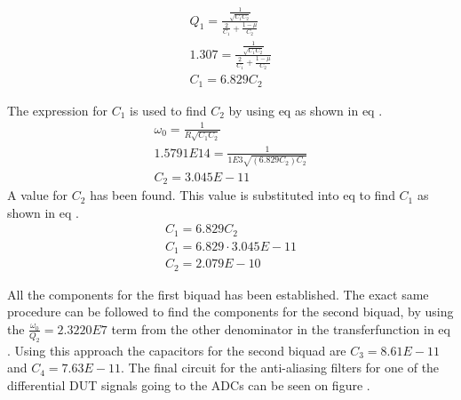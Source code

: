  \begin{equation}\label{eq:7_1_4_C1}
    \begin{aligned}
        Q_1 = \frac{ \frac{1}{\sqrt{C_1C_2}} }{ \frac{2}{C_1} + \frac{1-\mu}{C_2}}\\
        1.307 = \frac{ \frac{1}{\sqrt{C_1C_2}} }{ \frac{2}{C_1} + \frac{1-\mu}{C_2}}\\
        C_1 = 6.829C_2
    \end{aligned}
 \end{equation}

 The expression for $C_1$ is used to find $C_2$ by using eq  as shown in eq .
 \begin{equation}\label{eq:7_1_4_C2}
    \begin{aligned}
        \omega_0 = \frac{1}{R\sqrt{C_1C_2}}\\
        1.5791E14 = \frac{1}{1E3\sqrt{(6.829C_2)C_2}}\\
        C_2 = 3.045E-11
    \end{aligned}
 \end{equation}
 A value for $C_2$ has been found. This value is substituted into eq  to find $C_1$ as shown in eq .
 \begin{equation}\label{eq:7_1_4_C1_CAL}
    \begin{aligned}
        C_1 = 6.829C_2\\
        C_1 = 6.829\cdot  3.045E-11\\
        C_2 = 2.079E-10
    \end{aligned}
 \end{equation}

 All the components for the first biquad has been established. The exact same procedure can be followed to find the components for the second biquad, by using the $\frac{\omega_0}{Q_2} = 2.3220E7$ term from the other denominator in the transferfunction in eq . Using this approach the capacitors for the second biquad are $C_3 = 8.61E-11$ and $C_4 = 7.63E-11$. The final circuit for the anti-aliasing filters for one of the differential DUT signals going to the ADCs can be seen on figure .

